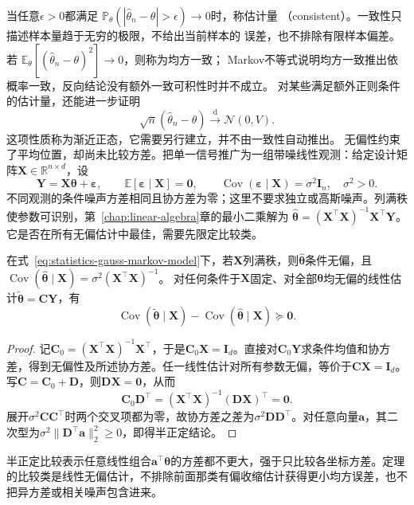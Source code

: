 当任意\(\epsilon>0\)都满足
\(\mathbb{P}_\theta(|\widehat\theta_n-\theta|>\epsilon)\to0\)时，称估计量
（consistent）。一致性只描述样本量趋于无穷的极限，不给出当前样本的
误差，也不排除有限样本偏差。若
\(\mathbb{E}_\theta[(\widehat\theta_n-\theta)^2]\to0\)，则称为均方一致；
Markov不等式说明均方一致推出依概率一致，反向结论没有额外一致可积性时并不成立。
对某些满足额外正则条件的估计量，还能进一步证明
\[
  \sqrt n(\widehat\theta_n-\theta)
  \xrightarrow{\mathrm d}\mathcal N(0,V).
\]
这项性质称为渐近正态，它需要另行建立，并不由一致性自动推出。
无偏性约束了平均位置，却尚未比较方差。把单一信号推广为一组带噪线性观测：给定设计矩阵\(\bm X\in\mathbb R^{n\times d}\)，设
\begin{equation}
  \bm Y=\bm X\bm\theta+\bm\varepsilon,\qquad
  \mathbb E[\bm\varepsilon\mid\bm X]=\bm0,\qquad
  \operatorname{Cov}(\bm\varepsilon\mid\bm X)=\sigma^2\bm I_n,
  \quad\sigma^2>0.
  \label{eq:statistics-gauss-markov-model}
\end{equation}
不同观测的条件噪声方差相同且协方差为零；这里不要求独立或高斯噪声。列满秩使参数可识别，第~\ref{chap:linear-algebra}章的最小二乘解为
\(\widehat{\bm\theta}=(\bm X^\top\bm X)^{-1}\bm X^\top\bm Y\)。它是否在所有无偏估计中最佳，需要先限定比较类。
\begin{theorem}
  \label{thm:statistics-gauss-markov}
  在式~\eqref{eq:statistics-gauss-markov-model}下，若\(\bm X\)列满秩，则\(\widehat{\bm\theta}\)条件无偏，且
  \(\operatorname{Cov}(\widehat{\bm\theta}\mid\bm X)=\sigma^2(\bm X^\top\bm X)^{-1}\)。
  对任何条件于\(\bm X\)固定、对全部\(\bm\theta\)均无偏的线性估计\(\widetilde{\bm\theta}=\bm C\bm Y\)，有
  \[
    \operatorname{Cov}(\widetilde{\bm\theta}\mid\bm X)
    -\operatorname{Cov}(\widehat{\bm\theta}\mid\bm X)\succeq\bm0.
  \]
\end{theorem}
\begin{proof}
记\(\bm C_0=(\bm X^\top\bm X)^{-1}\bm X^\top\)，于是\(\bm C_0\bm X=\bm I_d\)。直接对\(\bm C_0\bm Y\)求条件均值和协方差，得到无偏性及所述协方差。任一线性估计对所有参数无偏，等价于\(\bm C\bm X=\bm I_d\)。写\(\bm C=\bm C_0+\bm D\)，则\(\bm D\bm X=\bm0\)，从而
\[
  \bm C_0\bm D^\top
  =(\bm X^\top\bm X)^{-1}(\bm D\bm X)^\top=\bm0.
\]
展开\(\sigma^2\bm C\bm C^\top\)时两个交叉项都为零，故协方差之差为\(\sigma^2\bm D\bm D^\top\)。对任意向量\(\bm a\)，其二次型为\(\sigma^2\|\bm D^\top\bm a\|_2^2\geq0\)，即得半正定结论。
\end{proof}
半正定比较表示任意线性组合\(\bm a^\top\bm\theta\)的方差都不更大，强于只比较各坐标方差。定理的比较类是线性无偏估计，不排除前面那类有偏收缩估计获得更小均方误差，也不把异方差或相关噪声包含进来。

